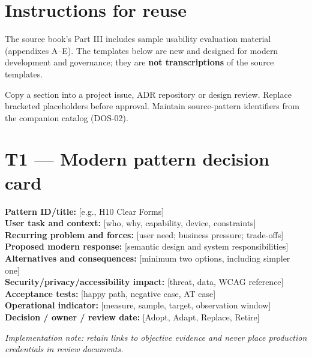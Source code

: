 \documentclass[11pt]{article}
\begin{document}
\MakeFront
\section{Instructions for reuse}

\Provenance
\begin{groundedbox}The source book's Part III includes sample usability evaluation material (appendixes A--E). The templates below are new and designed for modern development and governance; they are \textbf{not transcriptions} of the source templates.\end{groundedbox}
Copy a section into a project issue, ADR repository or design review. Replace bracketed placeholders before approval. Maintain source-pattern identifiers from the companion catalog (DOS-02).

\section{T1 — Modern pattern decision card}
\begin{notebox}
\textbf{Pattern ID/title:} [e.g., H10 Clear Forms]\\
\textbf{User task and context:} [who, why, capability, device, constraints]\\
\textbf{Recurring problem and forces:} [user need; business pressure; trade-offs]\\
\textbf{Proposed modern response:} [semantic design and system responsibilities]\\
\textbf{Alternatives and consequences:} [minimum two options, including simpler one]\\
\textbf{Security/privacy/accessibility impact:} [threat, data, WCAG reference]\\
\textbf{Acceptance tests:} [happy path, negative case, AT case]\\
\textbf{Operational indicator:} [measure, sample, target, observation window]\\
\textbf{Decision / owner / review date:} [Adopt, Adapt, Replace, Retire]\par\end{notebox}
\textit{Implementation note: retain links to objective evidence and never place production credentials in review documents.}
\end{document}
